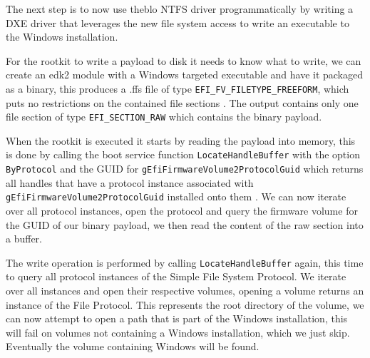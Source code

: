 
The next step is to now use theblo NTFS driver programmatically by writing a DXE driver that leverages the new file system access to write an executable to the Windows installation.


For the rootkit to write a payload to disk it needs to know what to write, we can create an edk2 module with a Windows targeted executable and have it packaged as a binary, this produces a .ffs file of type \lstinline{EFI_FV_FILETYPE_FREEFORM}, which puts no restrictions on the contained file sections \cite[Vol 3, 2.1.4.1.7]{pi-spec}. The output contains only one file section of type \lstinline{EFI_SECTION_RAW} which contains the binary payload.

When the rootkit is executed it starts by reading the payload into memory, this is done by calling the boot service function \lstinline{LocateHandleBuffer} with the option \lstinline{ByProtocol} and the GUID for \lstinline{gEfiFirmwareVolume2ProtocolGuid} which returns all handles that have a protocol instance associated with \lstinline{gEfiFirmwareVolume2ProtocolGuid} installed onto them \cite[7.3]{uefi-spec}. We can now iterate over all protocol instances, open the protocol and query the firmware volume for the GUID of our binary payload, we then read the content of the raw section into a buffer. 



The write operation is performed by calling \lstinline{LocateHandleBuffer} again, this time to query all protocol instances of the Simple File System Protocol. We iterate over all instances and open their respective volumes, opening a volume returns an instance of the File Protocol. This represents the root directory of the volume, we can now attempt to open a path that is part of the Windows installation, this will fail on volumes not containing a Windows installation, which we just skip. Eventually the volume containing Windows will be found.

